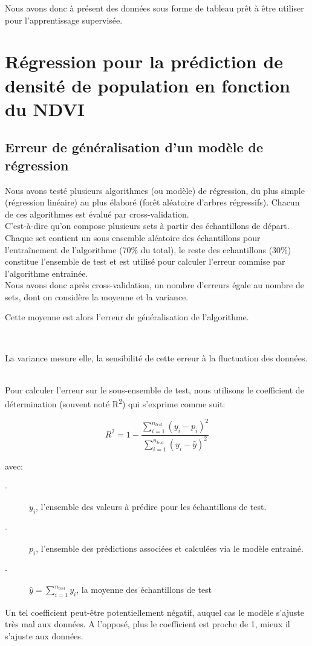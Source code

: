 \documentclass{book}
\begin{document}
\clearpage

Nous avons donc à présent des données sous forme de tableau prêt à être utiliser pour l'apprentissage supervisée.

\chapter{Régression pour la prédiction de densité de population en fonction du NDVI}

\section{Erreur de généralisation d'un modèle de régression}

Nous avons testé plusieurs algorithmes (ou modèle) de régression, du plus simple (régression linéaire) au plus élaboré (forêt aléatoire d'arbres régressifs).
Chacun de ces algorithmes est évalué par cross-validation. \\
C'est-à-dire qu'on compose plusieurs sets à partir des échantillons de départ. Chaque set contient un sous ensemble
aléatoire des échantillons pour l'entraînement de l'algorithme (70\% du total), le reste des echantillons (30\%) constitue l'ensemble de test
et est utilisé pour calculer l'erreur commise par l'algorithme entrainée.\\
Nous avons donc après cross-validation, un nombre d'erreurs égale au nombre de sets, dont on considère la moyenne et la variance.\\
\begin{bf}Cette moyenne est alors l'erreur de généralisation de l'algorithme.\end{bf}\\
\begin{bf}La variance mesure elle, la sensibilité de cette erreur à la fluctuation des données.\end{bf}\\
Pour calculer l'erreur sur le sous-ensemble de test, nous utilisons le coefficient de détermination (souvent noté R\textsuperscript{2}) qui s'exprime
comme suit:

\begin{equation}
R^{2} = 1-\frac{\sum \limits_{\underset{}{i=1}}^{n_{test}} (y_i-p_i)^2}{\sum \limits_{\underset{}{i=1}}^{n_{test}} (y_i-\widehat{y})^2}
\end{equation}

avec:
\begin{description}
\item[-] ${y_i}$, l'ensemble des valeurs à prédire pour les échantillons de test.
\item[-] ${p_i}$, l'ensemble des prédictions associées et calculées via le modèle entrainé.
\item[-] $\widehat{y} = \sum \limits_{\underset{}{i=1}}^{n_{test}} y_i$, la moyenne des échantillons de test
\end{description}
Un tel coefficient peut-\^{e}tre potentiellement négatif, auquel cas le modèle s'ajuste très mal aux données. A l'opposé, plus le coefficient
est proche de 1, mieux il s'ajuste aux données.
\end{document}

